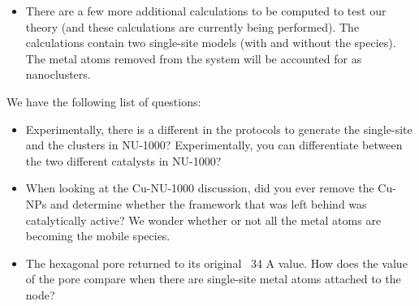 \documentclass[journal=jctcce,manuscript=article]{achemso}
\begin{document}
\begin{itemize}
\begin{itemize}
        \item There are a few more additional calculations to be computed to test our theory (and these calculations are currently being performed). The calculations contain two single-site models (with and without the  species). The metal atoms removed from the system will be accounted for as nanoclusters.
    \end{itemize}
\end{itemize}
We have the following list of questions:
\begin{itemize}
    \item Experimentally, there is a different in the protocols to generate the single-site and the clusters in NU-1000? Experimentally, you can differentiate between the two different catalysts in NU-1000? 
    \item When looking at the Cu-NU-1000 discussion, did you ever remove the Cu-NPs and determine whether the framework that was left behind was catalytically active? We wonder whether or not all the metal atoms are becoming the mobile  species. 
    \item The hexagonal pore returned to its original ~34 A value. How does the value of the pore compare when there are single-site metal atoms attached to the node? 
\end{itemize}


\end{document}

